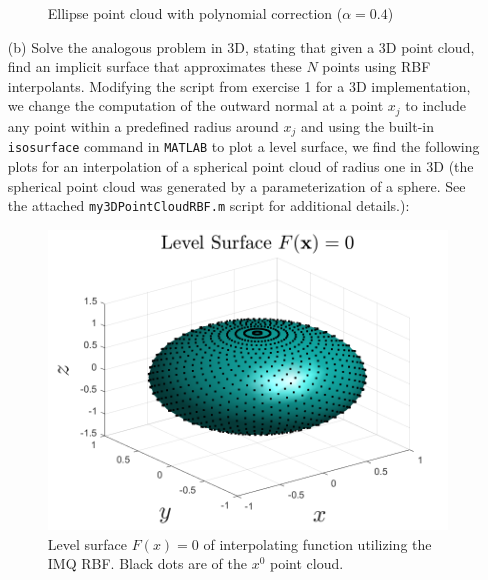 \documentclass{article}
\begin{document}
\begin{itemize}
\begin{figure}[H]
        \centering
        \caption{Ellipse point cloud with polynomial correction ($\alpha = 0.4$)}
    \end{figure}
    
    

    \item[(b)] Solve the analogous problem in 3D, stating that given a 3D point cloud, find an implicit surface that approximates these $N$ points using RBF interpolants.
    \newline\newline
    Modifying the script from exercise 1 for a 3D implementation, we change the computation of the outward normal at a point $x_j$ to include any point within a predefined radius around $x_j$ and using the built-in \verb+isosurface+ command in \verb+MATLAB+ to plot a level surface, we find the following plots for an interpolation of a spherical point cloud of radius one in 3D (the spherical point cloud was generated by a parameterization of a sphere. See the attached \verb+my3DPointCloudRBF.m+ script for additional details.):
    \begin{figure}[H]
        \includegraphics[scale = 0.5]{levelSphere_0_IMQ.png}
        \centering
        \caption{Level surface $F(x) = 0$ of interpolating function utilizing the IMQ RBF. Black dots are of the $x^0$ point cloud.}
    \end{figure}
    \begin{figure}[H]

\end{figure}
\end{itemize}
\end{document}
